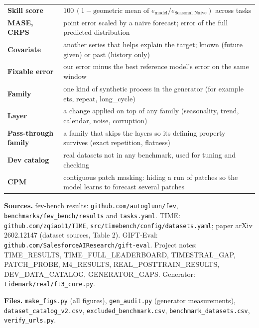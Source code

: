 \documentclass[10pt,a4paper]{article}
\begin{document}
\begin{table}[H]
\centering\small
\begin{tabularx}{\linewidth}{>{\raggedright\arraybackslash\bfseries}p{3.4cm} Y}
\toprule
Skill score & $100\,(1-\text{geometric mean of } e_{\text{model}}/e_{\text{Seasonal Naive}})$ across tasks \\
MASE, CRPS & point error scaled by a naive forecast; error of the full predicted distribution \\
Covariate & another series that helps explain the target; known (future given) or past (history only) \\
Fixable error & our error minus the best reference model's error on the same window \\
Family & one kind of synthetic process in the generator (for example ets, repeat, long\_cycle) \\
Layer & a change applied on top of any family (seasonality, trend, calendar, noise, corruption) \\
Pass-through family & a family that skips the layers so its defining property survives (exact repetition, flatness) \\
Dev catalog & real datasets not in any benchmark, used for tuning and checking \\
CPM & contiguous patch masking: hiding a run of patches so the model learns to forecast several patches \\
\bottomrule
\end{tabularx}
\end{table}

{\sloppy\textbf{Sources.} fev-bench results: \texttt{github.com/autogluon/fev}, \texttt{benchmarks/fev\_bench/results} and \texttt{tasks.yaml}. TIME: \texttt{github.com/zqiao11/TIME}, \texttt{src/timebench/config/datasets.yaml}; paper arXiv 2602.12147 (dataset sources, Table 2). GIFT-Eval: \texttt{github.com/SalesforceAIResearch/gift-eval}. Project notes: TIME\_RESULTS, TIME\_FULL\_LEADERBOARD, TIMESTRAL\_GAP, PATCH\_PROBE, M4\_RESULTS, REAL\_POSTTRAIN\_RESULTS, DEV\_DATA\_CATALOG, GENERATOR\_GAPS. Generator: \texttt{tidemark/real/ft3\_core.py}.

\textbf{Files.} \texttt{make\_figs.py} (all figures), \texttt{gen\_audit.py} (generator measurements), \texttt{dataset\_catalog\_v2.csv}, \texttt{excluded\_benchmark.csv}, \texttt{benchmark\_datasets.csv}, \texttt{verify\_urls.py}.\par}
\end{document}
